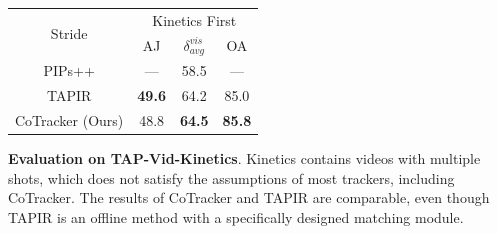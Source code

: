\begin{tabular}{cccc}
\toprule
 \multirow{2}{*}{Stride} &  \multicolumn{3}{c}{Kinetics First} \\
\cmidrule(lr){2-4}
                         &  AJ                                 &  $\delta^{vis}_{avg}$ &  OA           \\
\midrule
PIPs++                   &  ---                                &  58.5                 &  ---          \\
TAPIR                    &  \textbf{49.6}                      &  64.2                 &  85.0         \\
CoTracker (Ours)         &  48.8                               &  \textbf{64.5}        &  \textbf{85.8}
                         \\ \bottomrule
\end{tabular}
\caption{
\textbf{Evaluation on TAP-Vid-Kinetics}. Kinetics contains videos with multiple shots, which does not satisfy the assumptions of most trackers, including CoTracker. The results of CoTracker and TAPIR are comparable, even though TAPIR is an offline method with a specifically designed matching module.
}\label{tab_kinetics}
\vspace{2em}